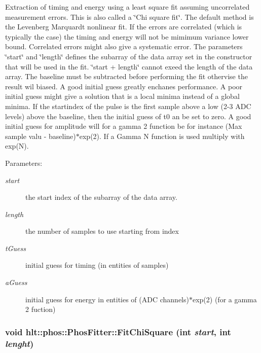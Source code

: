 Extraction of timing and energy using a least square fit assuming uncorrelated measurement errors. This is also called a \char`\"{}Chi square fit\char`\"{}. The default method is the Levenberg Marquardt nonlinear fit. If the errors are correlated (which is typically the case) the timing and energy will not be mimimum variance lower bound. Correlated errors might also give a systematic error. The parameters \char`\"{}start\char`\"{} and \char`\"{}length\char`\"{} defines the subarray of the data array set in the constructor that will be used in the fit. \char`\"{}start + length\char`\"{} cannot exeed the length of the data array. The baseline must be subtracted before performing the fit othervise the result wil biased. A good initial guess greatly enchanes performance. A poor initial guess might give a solution that is a local minima instead of a global minima. If the startindex of the pulse is the first sample above a low (2-3 ADC levels) above the baseline, then the initial guess of t0 an be set to zero. A good initial guess for amplitude will for a gamma 2 function be for instance (Max sample valu - baseline)$\ast$exp(2). If a Gamma N function is used multiply with exp(N). \begin{Desc}
\item[Parameters:]
\begin{description}
\item[{\em start}]the start index of the subarray of the data array. \item[{\em length}]the number of samples to use starting from index \item[{\em t\-Guess}]initial guess for timing (in entities of samples) \item[{\em a\-Guess}]initial guess for energy in entities of (ADC channels)$\ast$exp(2) (for a gamma 2 fuction) \end{description}
\end{Desc}
\subsubsection{\setlength{\rightskip}{0pt plus 5cm}void hlt::phos::Phos\-Fitter::Fit\-Chi\-Square (int {\em start}, int {\em lenght})}\label{classhlt_1_1phos_1_1PhosFitter_a6}


